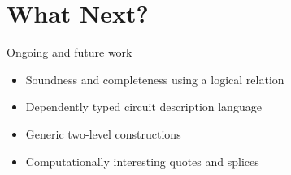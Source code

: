 \documentclass{beamer}
\begin{document}
\section{What Next?}

\begin{frame}{Ongoing and future work}
  \begin{itemize}
    \item Soundness and completeness using a logical relation
    \item Dependently typed circuit description language
    \item Generic two-level constructions
    \item Computationally interesting quotes and splices
  \end{itemize}
\end{frame}
\end{document}
